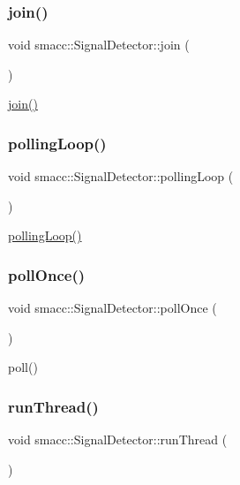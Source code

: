 \subsubsection{\texorpdfstring{join()}{join()}}
{\footnotesize\ttfamily void smacc\+::\+Signal\+Detector\+::join (\begin{DoxyParamCaption}{ }\end{DoxyParamCaption})}

\hyperlink{classsmacc_1_1SignalDetector_a636f704e469bf74b4a9fdb15bd63d5be}{join()} \mbox{\label{classsmacc_1_1SignalDetector_a2665e66cdae9f6533c64bbcecf3fa199}} 
\subsubsection{\texorpdfstring{polling\+Loop()}{pollingLoop()}}
{\footnotesize\ttfamily void smacc\+::\+Signal\+Detector\+::polling\+Loop (\begin{DoxyParamCaption}{ }\end{DoxyParamCaption})}

\hyperlink{classsmacc_1_1SignalDetector_a2665e66cdae9f6533c64bbcecf3fa199}{polling\+Loop()} \mbox{\label{classsmacc_1_1SignalDetector_a9a116479e23259f3a5d5d4a47278afd5}} 
\subsubsection{\texorpdfstring{poll\+Once()}{pollOnce()}}
{\footnotesize\ttfamily void smacc\+::\+Signal\+Detector\+::poll\+Once (\begin{DoxyParamCaption}{ }\end{DoxyParamCaption})}

poll() \mbox{\label{classsmacc_1_1SignalDetector_a48b3fee853ddcb25732408b22ecfcf39}} 
\subsubsection{\texorpdfstring{run\+Thread()}{runThread()}}
{\footnotesize\ttfamily void smacc\+::\+Signal\+Detector\+::run\+Thread (\begin{DoxyParamCaption}{ }\end{DoxyParamCaption})}

